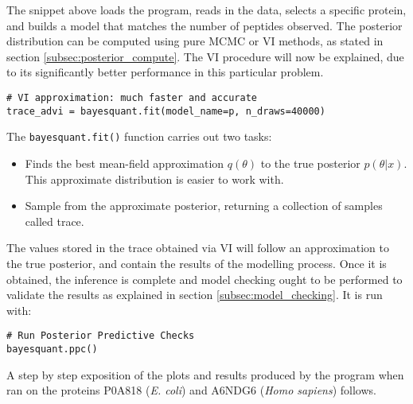 The snippet above loads the program, reads in the data, selects a specific protein, and builds a model that matches the number of peptides observed. The posterior distribution can be computed using pure MCMC or VI methods, as stated in section \ref{subsec:posterior_compute}. The VI procedure will now be explained, due to its significantly better performance in this particular problem.

\begin{verbatim}
# VI approximation: much faster and accurate
trace_advi = bayesquant.fit(model_name=p, n_draws=40000)
\end{verbatim}

The \texttt{bayesquant.fit()} function carries out two tasks:

\begin{itemize}
\item Finds the best mean-field approximation $q(\theta)$ to the true posterior $p(\theta|x)$. This approximate distribution is easier to work with.
\item Sample from the approximate posterior, returning a collection of samples called trace.
\end{itemize}

The values stored in the trace obtained via VI will follow an approximation to the true posterior, and contain the results of the modelling process. Once it is obtained, the inference is complete and model checking ought to be performed to validate the results as explained in section \ref{subsec:model_checking}. It is run with:

\begin{verbatim}
# Run Posterior Predictive Checks
bayesquant.ppc()
\end{verbatim}

A step by step exposition of the plots and results produced by the program when ran on the proteins  P0A818 (\textit{E. coli}) and A6NDG6 (\textit{Homo sapiens}) follows.

